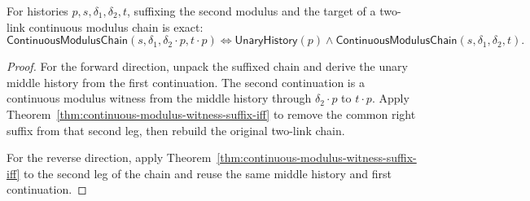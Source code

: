 \begin{theorem}
\label{thm:continuous-modulus-chain-suffix-iff}
For histories $p,s,\delta_1,\delta_2,t$, suffixing the second modulus and the
target of a two-link continuous modulus chain is exact:
$$
\mathsf{ContinuousModulusChain}(s,\delta_1,\delta_2\cdot p,t\cdot p)
\Longleftrightarrow
\mathsf{UnaryHistory}(p)\wedge
\mathsf{ContinuousModulusChain}(s,\delta_1,\delta_2,t).
$$
\end{theorem}
\begin{proof}
For the forward direction, unpack the suffixed chain and derive the unary
middle history from the first continuation. The second continuation is a
continuous modulus witness from the middle history through
$\delta_2\cdot p$ to $t\cdot p$. Apply
Theorem~\ref{thm:continuous-modulus-witness-suffix-iff} to remove the common
right suffix from that second leg, then rebuild the original two-link chain.

For the reverse direction, apply
Theorem~\ref{thm:continuous-modulus-witness-suffix-iff} to the second leg of
the chain and reuse the same middle history and first continuation.
\end{proof}
